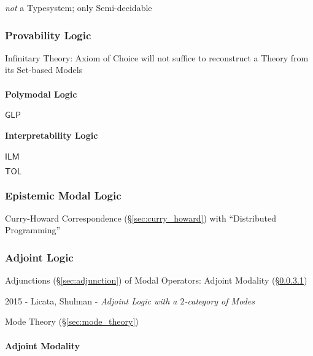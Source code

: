\emph{not} a Typesystem; only Semi-decidable



\subsubsection{Provability Logic}\label{sec:provability_logic}

Infinitary Theory: Axiom of Choice will not suffice to reconstruct a
Theory from its Set-based Models



\paragraph{Polymodal Logic}\label{sec:polymodal_logic}\hfill

$\mathsf{GLP}$



\paragraph{Interpretability Logic}\label{sec:interpretability_logic}\hfill

$\mathsf{ILM}$

$\mathsf{TOL}$



\subsubsection{Epistemic Modal Logic}\label{sec:epistemic_logic}

Curry-Howard Correspondence (\S\ref{sec:curry_howard}) with
``Distributed Programming''



\subsubsection{Adjoint Logic}\label{sec:adjoint_logic}

Adjunctions (\S\ref{sec:adjunction}) of Modal Operators: Adjoint
Modality (\S\ref{sec:adjoint_modality})

2015 - Licata, Shulman - \emph{Adjoint Logic with a $2$-category of Modes}

\fist Mode Theory (\S\ref{sec:mode_theory})



\paragraph{Adjoint Modality}\label{sec:adjoint_modality}\hfill


